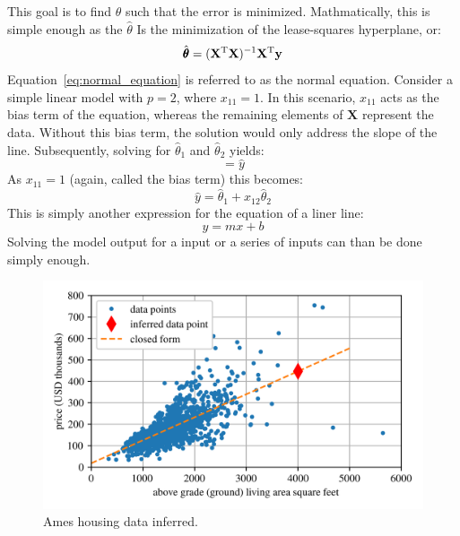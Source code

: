 \documentclass[12pt,letter]{article}
\begin{document}
This goal is to find $\hat{\theta}$ such that the error is minimized. Mathmatically, this is simple enough as the $\hat{\theta}$ Is the minimization of the lease-squares hyperplane, or:
\begin{equation}
\hat{\pmb{\theta}}=(\textbf{X}\textsuperscript{T}\textbf{X})^{-1}\textbf{X}\textsuperscript{T}\textbf{y}
\label{eq:normal_equation}
\end{equation}
Equation~\ref{eq:normal_equation} is referred to as the normal equation. Consider a simple linear model with $p = 2$, where $x_{11} = 1$. In this scenario, $x_{11}$ acts as the bias term of the equation, whereas the remaining elements of $\textbf{X}$ represent the data. Without this bias term, the solution would only address the slope of the line. Subsequently, solving for $\hat{\theta}_1$ and $\hat{\theta}_2$ yields:
\begin{equation}
 [x_{11}x_{12}][\hat{\theta}_1\hat{\theta}_2] = \hat{y}
\end{equation}
As $x_{11} = 1$ (again, called the bias term) this becomes:
\begin{equation}
 \hat{y} = \hat{\theta}_1 + x_{12}\hat{\theta}_2
\end{equation}
This is simply another expression for the equation of a liner line:
\begin{equation}
y = mx + b
\end{equation}
Solving the model output for a input or a series of inputs can than be done simply enough. 

\begin{figure}[H]
	\centering
	\includegraphics[]{../figures/Ames_simple_linear_regression_model_3.png}
	\caption{Ames housing data inferred.}
	\label{fig:Ames_simple_linear_regression_model_3}
\end{figure}
\end{document}
